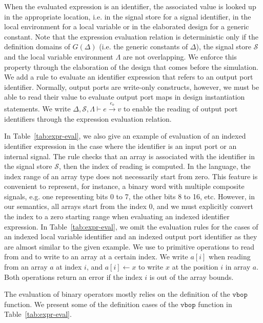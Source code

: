 \documentclass[pdflatex,sn-mathphys]{sn-jnl}%
\theoremstyle{thmstyleone}%
\theoremstyle{thmstyletwo}%
\theoremstyle{thmstylethree}%
\begin{document}
When the evaluated expression is an identifier, the associated value
is looked up in the appropriate location, i.e. in the signal store for
a signal identifier, in the local environment for a local variable or
in the elaborated design for a generic constant. Note that the
expression evaluation relation is deterministic only if the definition
domains of $G(\Delta)$ (i.e. the generic constants of $\Delta$), the
signal store $\mathcal{S}$ and the local variable environment
$\Lambda$ are not overlapping. We enforce this property through the
elaboration of the design that comes before the simulation. We add a
rule to evaluate an identifier expression that refers to an output
port identifier. Normally, output ports are write-only constructs,
however, we must be able to read their value to evaluate output port
maps in design instantiation statements. We write
$\Delta,\mathcal{S},\Lambda\vdash{}e\xrightarrow{e_o}v$ to enable the
reading of output port identifiers through the expression evaluation
relation.

In Table~\ref{tab:expr-eval}, we also give an example of evaluation of
an indexed identifier expression in the case where the identifier is
an input port or an internal signal. The rule checks that an array is
associated with the identifier in the signal store $\mathcal{S}$, then
the index of reading is computed. In the \hvhdl{} language, the index
range of an array type does not necessarily start from zero. This
feature is convenient to represent, for instance, a binary word with
multiple composite signals, e.g. one representing bits 0 to 7, the
other bits 8 to 16, etc. However, in our semantics, all arrays start
from the index 0, and we must explicitly convert the index to a zero
starting range when evaluating an indexed identifier expression. In
Table~\ref{tab:expr-eval}, we omit the evaluation rules for the cases
of an indexed local variable identifier and an indexed output port
identifier as they are almost similar to the given example. We use to
primitive operations to read from and to write to an array at a
certain index. We write $a[i]$ when reading from an array $a$ at index
$i$, and $a[i]\leftarrow{}x$ to write $x$ at the position $i$ in array
$a$. Both operations return an error if the index $i$ is out of the
array bounds.

The evaluation of binary operators mostly relies on the definition of
the $\mathtt{vbop}$ function. We present some of the definition cases
of the $\mathtt{vbop}$ function in Table~\ref{tab:expr-eval}.
\end{document}
